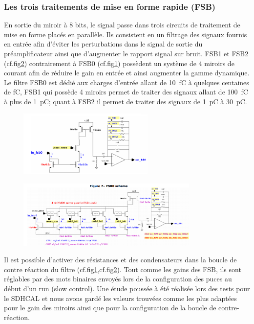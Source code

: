 \subsubsection{Les trois traitements de mise en forme rapide (FSB)}
En sortie du miroir à \num{8} bits, le signal passe dans trois circuits de traitement de mise en forme placés en parallèle. Ils consistent en un filtrage des signaux fournis en entrée afin d'éviter les perturbations dans le signal de sortie du préamplificateur ainsi que d'augmenter le rapport signal sur bruit. FSB1 et FSB2 (cf.fig\ref{fsb1}) contrairement à FSB0 (cf.fig\ref{fsb0}) possèdent un système de \num{4} miroirs de courant afin de réduire le gain en entrée et ainsi augmenter la gamme dynamique. Le filtre FSB0 est dédié aux charges d'entrée allant de \SI{10}{\femto\coulomb} à quelques centaines de \si{\femto\coulomb}, FSB1 qui possède \num{4} miroirs permet de traiter des signaux allant de \SI{100}{\femto\coulomb} à plus de \SI{1}{\pico\coulomb}; quant à FSB2 il permet de traiter des signaux de \SI{1}{\pico\coulomb} à \SI{30}{\pico\coulomb}.

\begin{figure}[ht!]
	\centering
	\includegraphics[width=0.60\textwidth]{GLA/FSB0.png}
	\label{fsb0}
\end{figure}

\begin{figure}[ht!]
	\centering
	\includegraphics[width=0.8\textwidth]{GLA/FSB1.png}
	\label{fsb1}
\end{figure}

Il est possible d'activer des résistances et des condensateurs dans la boucle de contre réaction du filtre (cf.fig\ref{fsb0},cf.fig\ref{fsb1}). Tout comme les gains des FSB, ils sont réglables par des mots binaires envoyés lors de la configuration des puces au début d'un run (slow control). Une étude poussée à été réalisée lors des tests pour le SDHCAL et nous avons gardé les valeurs trouvées comme les plus adaptées pour le gain des miroirs ainsi que pour la configuration de la boucle de contre-réaction.

